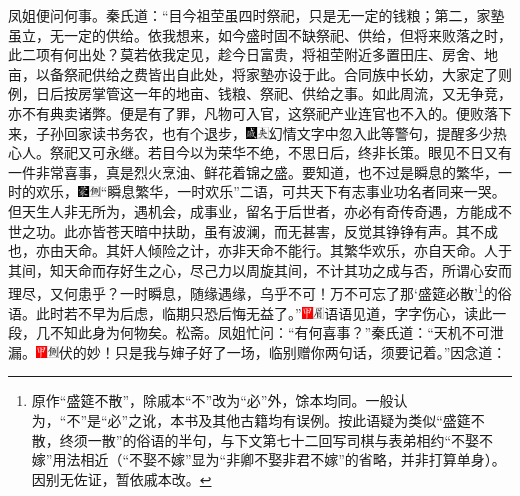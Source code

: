 凤姐便问何事。秦氏道：“目今祖茔虽四时祭祀，只是无一定的钱粮；第二，家塾虽立，无一定的供给。依我想来，如今盛时固不缺祭祀、供给，但将来败落之时，此二项有何出处？莫若依我定见，趁今日富贵，将祖茔附近多置田庄、房舍、地亩，以备祭祀供给之费皆出自此处，将家塾亦设于此。合同族中长幼，大家定了则例，日后按房掌管这一年的地亩、钱粮、祭祀、供给之事。如此周流，又无争竞，亦不有典卖诸弊。便是有了罪，凡物可入官，这祭祀产业连官也不入的。便败落下来，子孙回家读书务农，也有个退步，{\includegraphics[width=3mm]{../Images/00005}\includegraphics[width=3mm]{../Images/00012}\footnotesize \kaishu 幻情文字中忽入此等警句，提醒多少热心人。}祭祀又可永继。若目今以为荣华不绝，不思日后，终非长策。眼见不日又有一件非常喜事，真是烈火烹油、鲜花着锦之盛。要知道，也不过是瞬息的繁华，一时的欢乐，{\includegraphics[width=3mm]{../Images/00006}\includegraphics[width=3mm]{../Images/00011}\footnotesize \kaishu “瞬息繁华，一时欢乐”二语，可共天下有志事业功名者同来一哭。但天生人非无所为，遇机会，成事业，留名于后世者，亦必有奇传奇遇，方能成不世之功。此亦皆苍天暗中扶助，虽有波澜，而无甚害，反觉其铮铮有声。其不成也，亦由天命。其奸人倾险之计，亦非天命不能行。其繁华欢乐，亦自天命。人于其间，知天命而存好生之心，尽己力以周旋其间，不计其功之成与否，所谓心安而理尽，又何患乎？一时瞬息，随缘遇缘，乌乎不可！}万不可忘了那‘盛筵必散’\footnote{原作“盛筵不散”，除戚本“不”改为“必”外，馀本均同。一般认为，“不”是“必”之讹，本书及其他古籍均有误例。按此语疑为类似“盛筵不散，终须一散”的俗语的半句，与下文第七十二回写司棋与表弟相约“不娶不嫁”用法相近（“不娶不嫁”显为“非卿不娶非君不嫁”的省略，并非打算单身）。因别无佐证，暂依戚本改。}的俗语。此时若不早为后虑，临期只恐后悔无益了。”{\includegraphics[width=3mm]{../Images/00002}\includegraphics[width=3mm]{../Images/00010}\footnotesize \kaishu 语语见道，字字伤心，读此一段，几不知此身为何物矣。松斋。}凤姐忙问：“有何喜事？”秦氏道：“天机不可泄漏。{\includegraphics[width=3mm]{../Images/00002}\includegraphics[width=3mm]{../Images/00011}\footnotesize \kaishu 伏的妙！}只是我与婶子好了一场，临别赠你两句话，须要记着。”因念道：

